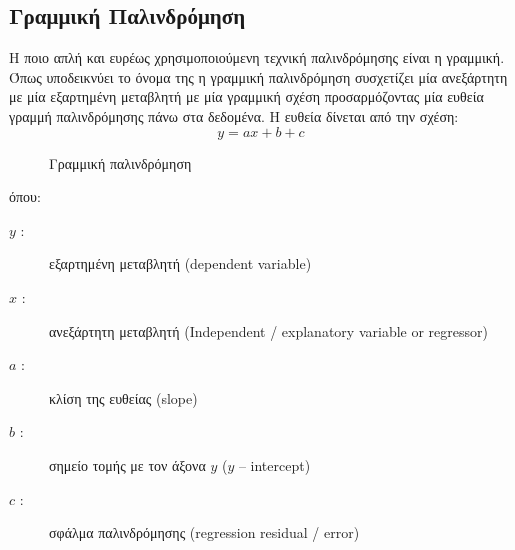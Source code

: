 \subsection{Γραμμική Παλινδρόμηση}
Η ποιο απλή και ευρέως χρησιμοποιούμενη τεχνική παλινδρόμησης είναι η γραμμική. Όπως
υποδεικνύει το όνομα της η γραμμική παλινδρόμηση συσχετίζει μία ανεξάρτητη με μία
εξαρτημένη μεταβλητή με μία γραμμική σχέση προσαρμόζοντας μία ευθεία γραμμή
παλινδρόμησης πάνω στα δεδομένα. Η ευθεία δίνεται από την σχέση:
$$y=ax+b+c$$
\begin{figure}[H]
    \centering
    \caption{Γραμμική παλινδρόμηση}
\end{figure}
όπου:
\begin{description}
    \item[$y$ :] εξαρτημένη μεταβλητή (\textlatin{dependent variabl}e)
    \item[$x$ :] ανεξάρτητη μεταβλητή (\textlatin{Independent / explanatory variable or regressor})
    \item[$a$ :] κλίση της ευθείας (\textlatin{slope})
    \item[$b$ :] σημείο τομής με τον άξονα $y$ ($y$ – \textlatin{intercept})
    \item[$c$ :] σφάλμα παλινδρόμησης (\textlatin{regression residual / error})
\end{description}

